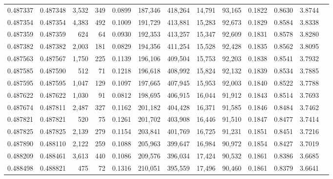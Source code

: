 \begin{tabular}{rrrrrrrrrrrrr}
0.487337 & 0.487348 & 3,532 &   349 &                                     0.0899 & 187,346 & 418,264 &  14,791 &  93,165 & 0.1822 & 0.8630 & 3.8744 \\
0.487354 & 0.487354 & 4,383 &   492 &                                     0.1009 & 191,729 & 413,881 &  15,283 &  92,673 & 0.1829 & 0.8584 & 3.8338 \\
0.487359 & 0.487359 &   624 &    64 &                                     0.0930 & 192,353 & 413,257 &  15,347 &  92,609 & 0.1831 & 0.8578 & 3.8280 \\
0.487382 & 0.487382 & 2,003 &   181 &                                     0.0829 & 194,356 & 411,254 &  15,528 &  92,428 & 0.1835 & 0.8562 & 3.8095 \\
0.487563 & 0.487567 & 1,750 &   225 &                                     0.1139 & 196,106 & 409,504 &  15,753 &  92,203 & 0.1838 & 0.8541 & 3.7932 \\
0.487585 & 0.487590 &   512 &    71 &                                     0.1218 & 196,618 & 408,992 &  15,824 &  92,132 & 0.1839 & 0.8534 & 3.7885 \\
0.487595 & 0.487595 & 1,047 &   129 &                                     0.1097 & 197,665 & 407,945 &  15,953 &  92,003 & 0.1840 & 0.8522 & 3.7788 \\
0.487622 & 0.487622 & 1,030 &    91 &                                     0.0812 & 198,695 & 406,915 &  16,044 &  91,912 & 0.1843 & 0.8514 & 3.7693 \\
0.487674 & 0.487811 & 2,487 &   327 &                                     0.1162 & 201,182 & 404,428 &  16,371 &  91,585 & 0.1846 & 0.8484 & 3.7462 \\
0.487821 & 0.487821 &   520 &    75 &                                     0.1261 & 201,702 & 403,908 &  16,446 &  91,510 & 0.1847 & 0.8477 & 3.7414 \\
0.487825 & 0.487825 & 2,139 &   279 &                                     0.1154 & 203,841 & 401,769 &  16,725 &  91,231 & 0.1851 & 0.8451 & 3.7216 \\
0.487890 & 0.488110 & 2,122 &   259 &                                     0.1088 & 205,963 & 399,647 &  16,984 &  90,972 & 0.1854 & 0.8427 & 3.7019 \\
0.488209 & 0.488461 & 3,613 &   440 &                                     0.1086 & 209,576 & 396,034 &  17,424 &  90,532 & 0.1861 & 0.8386 & 3.6685 \\
0.488498 & 0.488821 &   475 &    72 &                                     0.1316 & 210,051 & 395,559 &  17,496 &  90,460 & 0.1861 & 0.8379 & 3.6641 \\

\end{tabular}
